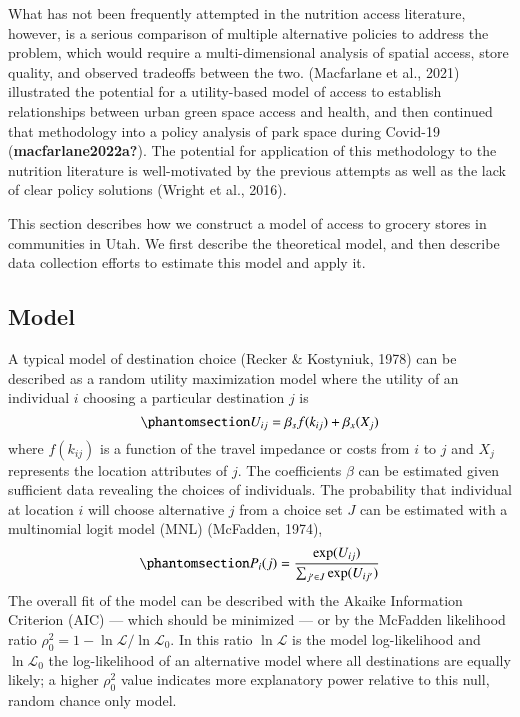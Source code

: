 \documentclass[
  letterpaper,
  number,
  review,
  doubleblind,
  3p]{elsarticle}
\begin{document}
What has not been frequently attempted in the nutrition access
literature, however, is a serious comparison of multiple alternative
policies to address the problem, which would require a multi-dimensional
analysis of spatial access, store quality, and observed tradeoffs
between the two. (Macfarlane et al., 2021) illustrated the potential for
a utility-based model of access to establish relationships between urban
green space access and health, and then continued that methodology into
a policy analysis of park space during Covid-19
(\textbf{macfarlane2022a?}). The potential for application of this
methodology to the nutrition literature is well-motivated by the
previous attempts as well as the lack of clear policy solutions (Wright
et al., 2016).

This section describes how we construct a model of access to grocery
stores in communities in Utah. We first describe the theoretical model,
and then describe data collection efforts to estimate this model and
apply it.

\subsection{Model}\label{model}

A typical model of destination choice (Recker \& Kostyniuk, 1978) can be
described as a random utility maximization model where the utility of an
individual \(i\) choosing a particular destination \(j\) is
\begin{equation}\phantomsection\label{eq-utility}{ U_{ij} = \beta_{s}f(k_{ij}) + \beta_{x}(X_j) }\end{equation}
where \(f(k_{ij})\) is a function of the travel impedance or costs from
\(i\) to \(j\) and \(X_{j}\) represents the location attributes of
\(j\). The coefficients \(\beta\) can be estimated given sufficient data
revealing the choices of individuals. The probability that individual at
location \(i\) will choose alternative \(j\) from a choice set \(J\) can
be estimated with a multinomial logit model (MNL) (McFadden, 1974),
\begin{equation}\phantomsection\label{eq-mnl}{ P_i(j) = \frac{\exp(U_{ij})}{\sum_{j' \in J}{\exp(U_{ij'})}}}\end{equation}
The overall fit of the model can be described with the Akaike
Information Criterion (AIC) --- which should be minimized --- or by the
McFadden likelihood ratio
\(\rho^2_0 = 1 - \ln\mathcal{L} / \ln\mathcal{L}_0\). In this ratio
\(\ln{\mathcal{L}}\) is the model log-likelihood and
\(\ln{\mathcal{L}_0}\) the log-likelihood of an alternative model where
all destinations are equally likely; a higher \(\rho^2_0\) value
indicates more explanatory power relative to this null, random chance
only model.
\end{document}
